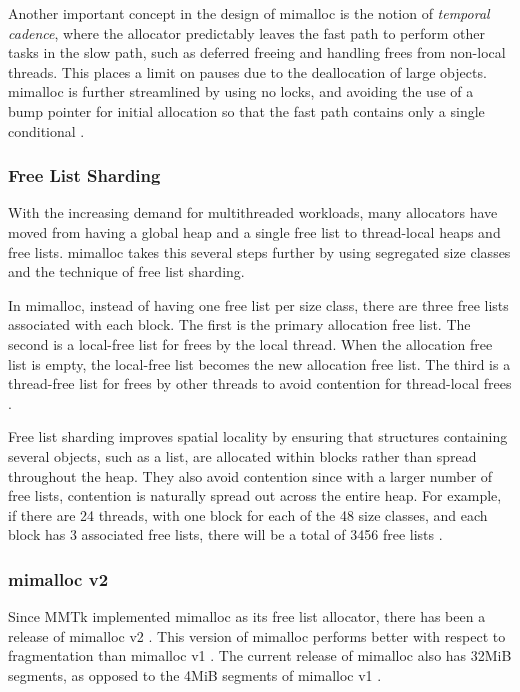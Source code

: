 \documentclass{article}
\begin{document}
Another important concept in the design of mimalloc is the notion of \emph{temporal cadence}, where the allocator predictably leaves the fast path to perform other tasks in the slow path, such as deferred freeing and handling frees from non-local threads. This places a limit on pauses due to the deallocation of large objects. mimalloc is further streamlined by using no locks, and avoiding the use of a bump pointer for initial allocation so that the fast path contains only a single conditional \cite{leijen2019mimalloc}.

\subsubsection{Free List Sharding}
With the increasing demand for multithreaded workloads, many allocators have moved from having a global heap and a single free list to thread-local heaps and free lists. mimalloc takes this several steps further by using segregated size classes and the technique of free list sharding.

In mimalloc, instead of having one free list per size class, there are three free lists associated with each block. The first is the primary allocation free list. The second is a local-free list for frees by the local thread. When the allocation free list is empty, the local-free list becomes the new allocation free list. The third is a thread-free list for frees by other threads to avoid contention for thread-local frees \cite{leijen2019mimalloc}.

Free list sharding improves spatial locality by ensuring that structures containing several objects, such as a list, are allocated within blocks rather than spread throughout the heap. They also avoid contention since with a larger number of free lists, contention is naturally spread out across the entire heap. For example, if there are 24 threads, with one block for each of the 48 size classes, and each block has 3 associated free lists, there will be a total of 3456 free lists \cite{leijen2019mimalloc}.

\subsubsection{mimalloc v2}
Since MMTk implemented mimalloc as its free list allocator, there has been a release of mimalloc v2 \cite{mimalloc}. This version of mimalloc performs better with respect to fragmentation than mimalloc v1 \cite{mimalloc}. The current release of mimalloc also has 32MiB segments, as opposed to the 4MiB segments of mimalloc v1 \cite{mimalloc}.
\end{document}
